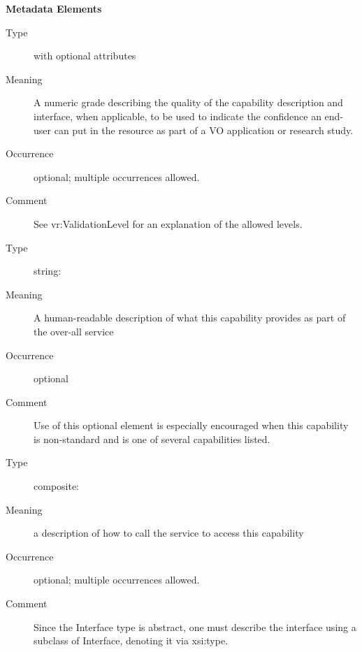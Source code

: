 \documentclass[11pt,a4paper]{ivoa}
\begin{document}
\begin{generated}
\vspace{0.5ex}\noindent\textbf{ Metadata Elements}

\begingroup\small\begin{bigdescription}\item[Element \xmlel{validationLevel}]
\begin{description}
\item[Type]  with optional attributes
\item[Meaning]
                  A numeric grade describing the quality of the
                  capability description and interface, when applicable,
                  to be used to indicate the confidence an end-user
                  can put in the resource as part of a VO application
                  or research study.

\item[Occurrence] optional; multiple occurrences allowed.
\item[Comment]
                  See vr:ValidationLevel for an explanation of the
                  allowed levels.


\end{description}
\item[Element \xmlel{description}]
\begin{description}
\item[Type] string: 
\item[Meaning]
                  A human-readable description of what this capability
                  provides as part of the over-all service

\item[Occurrence] optional
\item[Comment]
                  Use of this optional element is especially encouraged when
                  this capability is non-standard and is one of several
                  capabilities listed.


\end{description}
\item[Element \xmlel{interface}]
\begin{description}
\item[Type] composite: 
\item[Meaning]
                  a description of how to call the service to access
                  this capability

\item[Occurrence] optional; multiple occurrences allowed.
\item[Comment]
                  Since the Interface type is abstract, one must describe
                  the interface using a subclass of Interface, denoting
                  it via xsi:type.


\end{description}
\end{bigdescription}
\end{generated}
\end{document}
